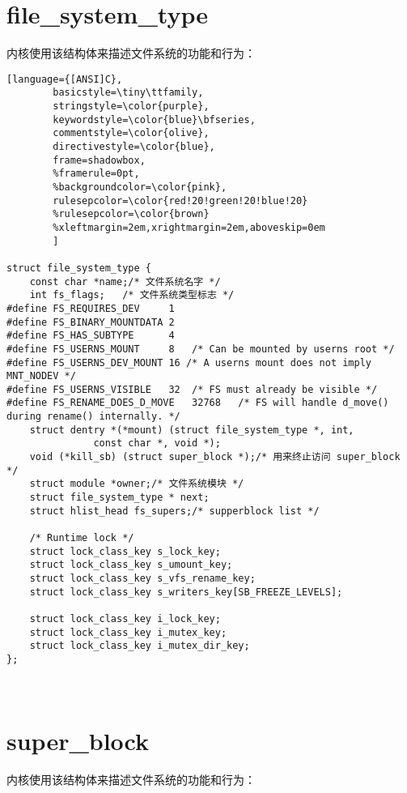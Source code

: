 \section{file\_system\_type}

	内核使用该结构体来描述文件系统的功能和行为：

\begin{lstlisting}[language={[ANSI]C},
        basicstyle=\tiny\ttfamily,
        stringstyle=\color{purple},
        keywordstyle=\color{blue}\bfseries,
        commentstyle=\color{olive},
        directivestyle=\color{blue},
        frame=shadowbox,
        %framerule=0pt,
        %backgroundcolor=\color{pink},
        rulesepcolor=\color{red!20!green!20!blue!20}
        %rulesepcolor=\color{brown}
        %xleftmargin=2em,xrightmargin=2em,aboveskip=0em
        ]
        
struct file_system_type {
	const char *name;/* 文件系统名字 */
	int fs_flags;	/* 文件系统类型标志 */
#define FS_REQUIRES_DEV		1 
#define FS_BINARY_MOUNTDATA	2
#define FS_HAS_SUBTYPE		4
#define FS_USERNS_MOUNT		8	/* Can be mounted by userns root */
#define FS_USERNS_DEV_MOUNT	16 /* A userns mount does not imply MNT_NODEV */
#define FS_USERNS_VISIBLE	32	/* FS must already be visible */
#define FS_RENAME_DOES_D_MOVE	32768	/* FS will handle d_move() during rename() internally. */
	struct dentry *(*mount) (struct file_system_type *, int,
		       const char *, void *);
	void (*kill_sb) (struct super_block *);/* 用来终止访问 super_block */
	struct module *owner;/* 文件系统模块 */
	struct file_system_type * next;
	struct hlist_head fs_supers;/* supperblock list */

	/* Runtime lock */
	struct lock_class_key s_lock_key;
	struct lock_class_key s_umount_key;
	struct lock_class_key s_vfs_rename_key;
	struct lock_class_key s_writers_key[SB_FREEZE_LEVELS];

	struct lock_class_key i_lock_key;
	struct lock_class_key i_mutex_key;
	struct lock_class_key i_mutex_dir_key;
};
        
        
\end{lstlisting}



\section{super\_block}

	内核使用该结构体来描述文件系统的功能和行为：

